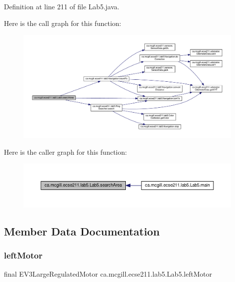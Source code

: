 Definition at line 211 of file Lab5.\+java.

Here is the call graph for this function\+:
\nopagebreak
\begin{figure}[H]
\begin{center}
\leavevmode
\includegraphics[width=350pt]{classca_1_1mcgill_1_1ecse211_1_1lab5_1_1_lab5_a0e80ac0068ef1ab41cfb571b8c65845c_cgraph}
\end{center}
\end{figure}
Here is the caller graph for this function\+:
\nopagebreak
\begin{figure}[H]
\begin{center}
\leavevmode
\includegraphics[width=350pt]{classca_1_1mcgill_1_1ecse211_1_1lab5_1_1_lab5_a0e80ac0068ef1ab41cfb571b8c65845c_icgraph}
\end{center}
\end{figure}


\subsection{Member Data Documentation}
\mbox{\label{classca_1_1mcgill_1_1ecse211_1_1lab5_1_1_lab5_a613e69d8f1e90a1161b78020571110fc}} 
\subsubsection{\texorpdfstring{left\+Motor}{leftMotor}}
{\footnotesize\ttfamily final E\+V3\+Large\+Regulated\+Motor ca.\+mcgill.\+ecse211.\+lab5.\+Lab5.\+left\+Motor\hspace{0.3cm}{\ttfamily [static]}}

